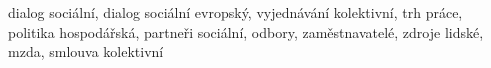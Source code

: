 dialog sociální, dialog sociální evropský, vyjednávání kolektivní, trh práce, politika hospodářská, partneři sociální, odbory, zaměstnavatelé, zdroje lidské, mzda, smlouva kolektivní